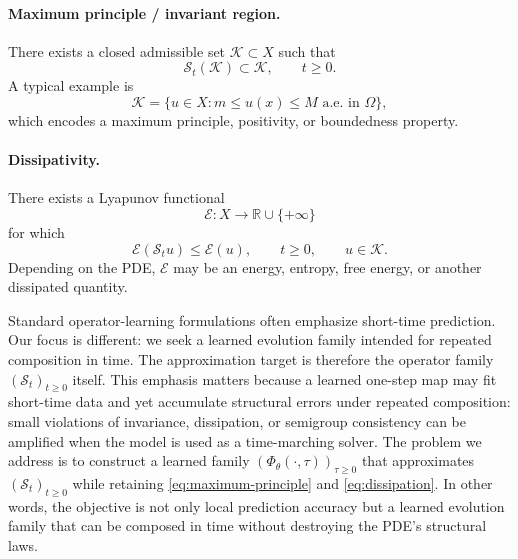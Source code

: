 \documentclass[11pt]{article}
\newcommand{\R}{\mathbb{R}}
\newcommand{\cS}{\mathcal{S}}
\newcommand{\cK}{\mathcal{K}}
\newcommand{\cE}{\mathcal{E}}
\newcommand{\PhiT}{\Phi_{\theta}}
\begin{document}
\paragraph{Maximum principle / invariant region.}
There exists a closed admissible set \(\cK\subset X\) such that
\begin{equation}\label{eq:maximum-principle}
\cS_t(\cK)\subset \cK, \qquad t\ge 0.
\end{equation}
A typical example is
\begin{equation}\label{eq:box-invariant}
\cK = \{u\in X : m\le u(x)\le M \text{ a.e. in } \Omega\},
\end{equation}
which encodes a maximum principle, positivity, or boundedness property.

\paragraph{Dissipativity.}
There exists a Lyapunov functional
\begin{equation}\label{eq:energy-type}
\cE : X \to \R\cup\{+\infty\}
\end{equation}
for which
\begin{equation}\label{eq:dissipation}
\cE(\cS_tu) \le \cE(u), \qquad t\ge 0, \qquad u\in \cK.
\end{equation}
Depending on the PDE, \(\cE\) may be an energy, entropy, free energy, or another dissipated quantity.

Standard operator-learning formulations often emphasize short-time prediction. Our focus is different: we seek a learned evolution family intended for repeated composition in time. The approximation target is therefore the operator family \((\cS_t)_{t\ge 0}\) itself. This emphasis matters because a learned one-step map may fit short-time data and yet accumulate structural errors under repeated composition: small violations of invariance, dissipation, or semigroup consistency can be amplified when the model is used as a time-marching solver. The problem we address is to construct a learned family \((\PhiT(\cdot,\tau))_{\tau\ge 0}\) that approximates \((\cS_t)_{t\ge 0}\) while retaining \eqref{eq:maximum-principle} and \eqref{eq:dissipation}. In other words, the objective is not only local prediction accuracy but a learned evolution family that can be composed in time without destroying the PDE's structural laws.
\end{document}
